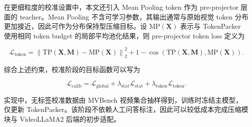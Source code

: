 \par 在更细粒度的校准设置中，本文还引入 Mean Pooling token 作为 pre-projector 层面的 teacher。Mean Pooling 不含可学习参数，其输出通常与原始视觉 token 分布更加接近，因此可作为分布保持型压缩目标。设 $\mathrm{MP}(\mathbf{X})$ 表示与 TokenPacker 使用相同 token budget 的局部平均池化结果，则 pre-projector token loss 定义为

\begin{equation}
    \label{equ:method-pre-token-loss}
    \mathcal{L}_{\mathrm{token}}
    =
    \left\|
        \mathrm{TP}(\mathbf{X},\mathbf{M}) -
        \mathrm{MP}(\mathbf{X})
    \right\|_2^2
    +
    1-\cos
    \left(
        \mathrm{TP}(\mathbf{X},\mathbf{M}),
        \mathrm{MP}(\mathbf{X})
    \right).
\end{equation}

\par 综合上述约束，校准阶段的目标函数可以写为

\begin{equation}
    \label{equ:method-calibration-loss}
    \mathcal{L}_{\mathrm{calib}}
    =
    \mathcal{L}_{\mathrm{global}}
    +
    \lambda_{\mathrm{stat}}\mathcal{L}_{\mathrm{stat}}
    +
    \lambda_{\mathrm{token}}\mathcal{L}_{\mathrm{token}}.
\end{equation}

\par 实现中，无标签校准数据由 MVBench 视频集合抽样得到\cite{mvbench2024}，训练时冻结主模型，仅更新 TokenPacker。该阶段不依赖人工问答标注，因此可以较低成本完成压缩模块与 VideoLLaMA2 后端的初步适配。

